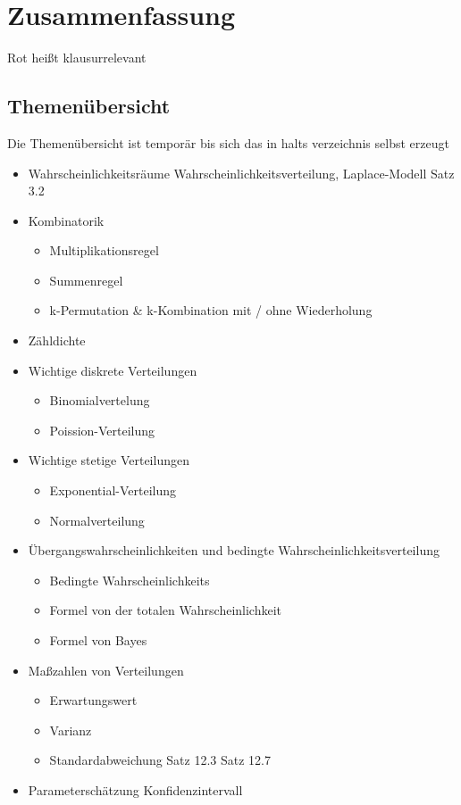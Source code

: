 \section{Zusammenfassung}
Rot heißt klausurrelevant

\subsection{Themenübersicht}
Die Themenübersicht ist temporär bis sich das in halts verzeichnis selbst erzeugt
\begin{itemize}
    \item Wahrscheinlichkeitsräume Wahrscheinlichkeitsverteilung, Laplace-Modell Satz 3.2
    \item Kombinatorik
    \begin{itemize}
        \item Multiplikationsregel
        \item Summenregel
        \item k-Permutation \& k-Kombination mit / ohne Wiederholung
    \end{itemize}
    \item Zähldichte
    \item Wichtige diskrete Verteilungen
    \begin{itemize}
        \item Binomialvertelung
        \item Poission-Verteilung
    \end{itemize}
    \item Wichtige stetige Verteilungen
    \begin{itemize}
        \item Exponential-Verteilung
        \item Normalverteilung
    \end{itemize}
    \item Übergangswahrscheinlichkeiten und bedingte Wahrscheinlichkeitsverteilung
    \begin{itemize}
        \item Bedingte Wahrscheinlichkeits
        \item Formel von der totalen Wahrscheinlichkeit
        \item Formel von Bayes
    \end{itemize}
    \item Maßzahlen von Verteilungen
    \begin{itemize}
        \item Erwartungswert
        \item Varianz
        \item Standardabweichung Satz 12.3 Satz 12.7
    \end{itemize}
    \item Parameterschätzung Konfidenzintervall
\end{itemize}

